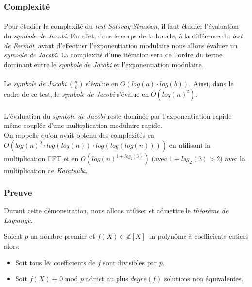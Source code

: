 	
	\subsubsection{Complexité}
		\paragraph{}Pour étudier la complexité du \textit{test Solovay-Strassen}, il faut étudier l'évaluation du \textit{symbole de Jacobi}. En effet, dans le corps de la boucle, à la différence du \textit{test de Fermat}, avant d'effectuer l'exponentiation modulaire nous allons évaluer un \textit{symbole de Jacobi}. La complexité d'une itération sera de l'ordre du terme dominant entre le \textit{symbole de Jacobi} et l'exponentiation modulaire.
		
		\paragraph{}Le \textit{symbole de Jacobi} $\left ( \frac{a}{b} \right )$ s'évalue en $O(log(a) \cdot log(b))$. Ainsi, dans le cadre de ce test, le \textit{symbole de Jacobi} s'évalue en $O(log(n)^{2})$.
		
		\paragraph{}L'évaluation du \textit{symbole de Jacobi} reste dominée par l'exponentiation rapide même couplée d'une multiplication modulaire rapide.\\
		\indent On rappelle qu'on avait obtenu des complexités en $O(log(n)^{2} \cdot log(log(n)) \cdot log(log(log(n))))$ en utilisant la multiplication FFT et en $ O(log(n)^{1 + log_{2}(3)})$ (avec $1 + log_{2}(3) > 2$) avec la multiplication de \textit{Karatsuba}.
				
	\subsubsection{Preuve}
		Durant cette démonstration, nous allons utiliser et admettre le \textit{théorème de Lagrange}.
		\vspace{-1.5em}\begin{adjustwidth}{1.5cm}{1.5cm} 
		\begin{Th}
			\label{ThLagrange}
			Soient $p$ un nombre premier et $f(X) \in \mathbb{Z}[X]$ un polynôme à coefficients entiers alors:
			\begin{itemize}
			\item Soit tous les coefficients de $f$ sont divisibles par $p$.
			\item Soit $f(X) \equiv 0 \text{ mod } p$ admet au plus $degre(f)$ solutions non équivalentes.
			\end{itemize}
		\end{Th}
		\end{adjustwidth}\vspace{0.5em}
		
